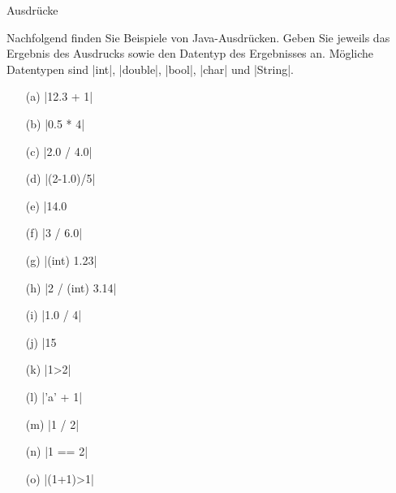 \begin{exercise}{Ausdrücke}

\begin{body}
Nachfolgend finden Sie Beispiele von Java-Ausdrücken. Geben Sie jeweils das Ergebnis des Ausdrucks sowie den 
Datentyp des Ergebnisses an. Mögliche Datentypen sind \code|int|, \code|double|, \code|bool|, \code|char| und \code|String|.
\begin{center}
\begin{minipage}{0.3\textwidth}
\begin{itemize}
\item[(a)] \code|12.3 + 1|
\item[(b)] \code|0.5 * 4|
\item[(c)] \code|2.0 / 4.0|
\item[(d)] \code|(2-1.0)/5| 
\item[(e)] \code|14.0 %
\end{itemize}
\end{minipage}
\begin{minipage}{0.3\textwidth}
\begin{itemize}
\item[(f)] \code|3 / 6.0|
\item[(g)] \code|(int) 1.23|
\item[(h)] \code|2 / (int) 3.14|
\item[(i)] \code|1.0 / 4|
\item[(j)] \code|15 %
\end{itemize}
\end{minipage}
\begin{minipage}{0.3\textwidth}
\begin{itemize}
\item[(k)] \code|1>2|
\item[(l)] \code|'a' + 1|
\item[(m)] \code|1 / 2|
\item[(n)] \code|1 == 2|
\item[(o)] \code|(1+1)>1|
\end{itemize}
\end{minipage}
\end{center}
\end{body}

\begin{solution}


\end{solution}
\end{exercise}

